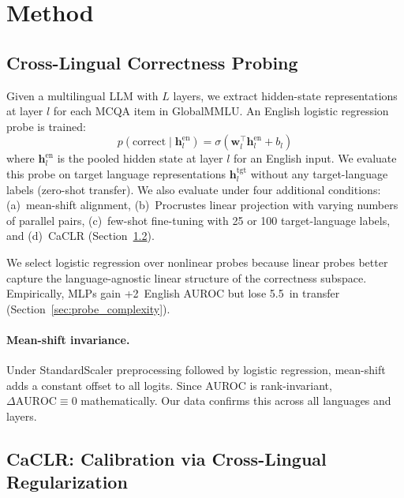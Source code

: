 \documentclass[11pt,a4paper]{article}
\newcommand{\pp}{\,\text{pp}}
\begin{document}
\section{Method}
\label{sec:method}

\subsection{Cross-Lingual Correctness Probing}
\label{sec:method:probing}

Given a multilingual LLM with $L$ layers, we extract hidden-state representations at layer $l$ for each MCQA item in GlobalMMLU. An English logistic regression probe is trained:
\begin{equation}
p(\text{correct} \mid \mathbf{h}_l^{\text{en}}) = \sigma(\mathbf{w}_l^\top \mathbf{h}_l^{\text{en}} + b_l)
\end{equation}
where $\mathbf{h}_l^{\text{en}}$ is the pooled hidden state at layer $l$ for an English input. We evaluate this probe on target language representations $\mathbf{h}_l^{\text{tgt}}$ without any target-language labels (zero-shot transfer). We also evaluate under four additional conditions: (a)~mean-shift alignment, (b)~Procrustes linear projection with varying numbers of parallel pairs, (c)~few-shot fine-tuning with 25 or 100 target-language labels, and (d)~CaCLR (Section~\ref{sec:method:caclr}).

We select logistic regression over nonlinear probes because linear probes better capture the language-agnostic linear structure of the correctness subspace. Empirically, MLPs gain +2\pp{} English AUROC but lose 5.5\pp{} in transfer (Section~\ref{sec:probe_complexity}).

\paragraph{Mean-shift invariance.} Under StandardScaler preprocessing followed by logistic regression, mean-shift adds a constant offset to all logits. Since AUROC is rank-invariant, $\Delta\text{AUROC} \equiv 0$ mathematically. Our data confirms this across all languages and layers.

\subsection{CaCLR: Calibration via Cross-Lingual Regularization}
\label{sec:method:caclr}
\end{document}

